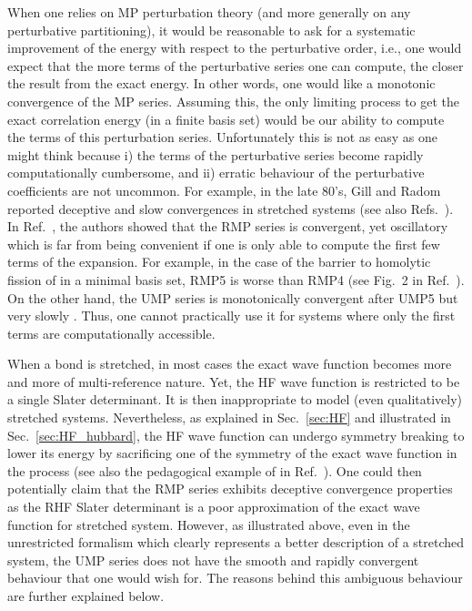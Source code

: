\documentclass[aps,prb,reprint,noshowkeys,linenumbers,superscriptaddress]{revtex4-1}
\newcommand{\latin}[1]{#1}
\newcommand{\ie}{\latin{i.e.}}
\begin{document}
When one relies on MP perturbation theory (and more generally on any perturbative partitioning), it would be reasonable to ask for a systematic improvement of the energy with respect to the perturbative order, \ie, one would expect that the more terms of the perturbative series one can compute, the closer the result from the exact energy.
In other words, one would like a monotonic convergence of the MP series. Assuming this, the only limiting process to get the exact correlation energy (in a finite basis set) would be our ability to compute the terms of this perturbation series.
Unfortunately this is not as easy as one might think because i) the terms of the perturbative series become rapidly computationally cumbersome, and ii) erratic behaviour of the perturbative coefficients are not uncommon. For example, in the late 80's, Gill and Radom reported deceptive and slow convergences in stretched systems \cite{Gill_1986,Gill_1988} (see also Refs.~). 
In Ref.~, the authors showed that the RMP series is convergent, yet oscillatory which is far from being convenient if one is only able to compute the first few terms of the expansion.
For example, in the case of the barrier to homolytic fission of  in a minimal basis set, RMP5 is worse than RMP4 (see Fig.~2 in Ref.~).
On the other hand, the UMP series is monotonically convergent after UMP5 but very slowly . 
Thus, one cannot practically use it for systems where only the first terms are computationally accessible.

When a bond is stretched, in most cases the exact wave function becomes more and more of multi-reference nature. 
Yet, the HF wave function is restricted to be a single Slater determinant.
It is then inappropriate to model (even qualitatively) stretched systems. 
Nevertheless, as explained in Sec.~\ref{sec:HF} and illustrated in Sec.~\ref{sec:HF_hubbard}, the HF wave function can undergo symmetry breaking to lower its energy by sacrificing one of the symmetry of the exact wave function in the process (see also the pedagogical example of  in Ref.~). 
One could then potentially claim that the RMP series exhibits deceptive convergence properties as the RHF Slater determinant is a poor approximation of the exact wave function for stretched system. 
However, as illustrated above, even in the unrestricted formalism which clearly represents a better description of a stretched system, the UMP series does not have the smooth and rapidly convergent behaviour that one would wish for. 
The reasons behind this ambiguous behaviour are further explained below.
\end{document}
